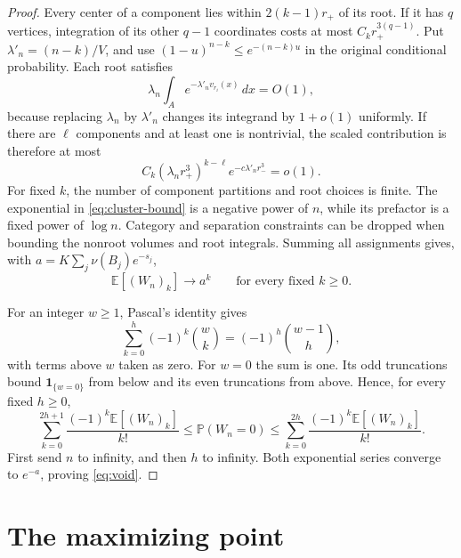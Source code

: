 \documentclass[11pt]{article}
\newcommand{\PP}{\mathbb P}
\newcommand{\EE}{\mathbb E}
\begin{document}
\begin{proof}
Every center of a component lies within $2(k-1)r_+$ of its root.
If it has $q$ vertices, integration of its other $q-1$ coordinates costs
at most $C_kr_+^{3(q-1)}$. Put $\lambda'_n=(n-k)/V$, and use
$(1-u)^{n-k}\leq e^{-(n-k)u}$ in the original conditional probability.
Each root satisfies
\[
 \lambda_n\int_Ae^{-\lambda'_nv_{r_i}(x)}\,dx=O(1),
\]
because replacing $\lambda_n$ by $\lambda'_n$ changes its integrand by
$1+o(1)$ uniformly. If there are $\ell$ components and at least one is
nontrivial, the scaled contribution is therefore at most
\begin{equation}\label{eq:cluster-bound}
 C_k(\lambda_nr_+^3)^{k-\ell}e^{-c\lambda'_nr_-^3}=o(1).
\end{equation}
For fixed $k$, the number of component partitions and root choices is
finite. The exponential in \eqref{eq:cluster-bound} is a negative power of
$n$, while its prefactor is a fixed power of $\log n$. Category and
separation constraints can be dropped when bounding the nonroot volumes
and root integrals. Summing all assignments gives, with
$a=K\sum_j\nu(B_j)e^{-s_j}$,
\[
 \EE[(W_n)_k]\longrightarrow a^k\qquad\text{for every fixed }k\geq0.
\]

For an integer $w\geq1$, Pascal's identity gives
\[
 \sum_{k=0}^h(-1)^k\binom wk=(-1)^h\binom{w-1}h,
\]
with terms above $w$ taken as zero. For $w=0$ the sum is one.
Its odd truncations bound $\mathbf1_{\{w=0\}}$ from below and its even
truncations from above. Hence, for every fixed $h\geq0$,
\[
 \sum_{k=0}^{2h+1}\frac{(-1)^k\EE[(W_n)_k]}{k!}
 \leq\PP(W_n=0)\leq
 \sum_{k=0}^{2h}\frac{(-1)^k\EE[(W_n)_k]}{k!}.
\]
First send $n$ to infinity, and then $h$ to infinity. Both exponential
series converge to $e^{-a}$, proving \eqref{eq:void}.
\end{proof}

\section{The maximizing point}
\end{document}
